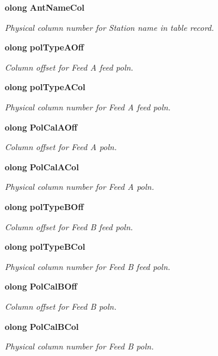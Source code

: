\begin{CompactItemize}
{\bf olong} {\bf Ant\-Name\-Col}
\begin{CompactList}\small\item\em Physical column number for Station name in table record. \item\end{CompactList}\item 
{\bf olong} {\bf pol\-Type\-AOff}
\begin{CompactList}\small\item\em Column offset for Feed A feed poln. \item\end{CompactList}\item 
{\bf olong} {\bf pol\-Type\-ACol}
\begin{CompactList}\small\item\em Physical column number for Feed A feed poln. \item\end{CompactList}\item 
{\bf olong} {\bf Pol\-Cal\-AOff}
\begin{CompactList}\small\item\em Column offset for Feed A poln. \item\end{CompactList}\item 
{\bf olong} {\bf Pol\-Cal\-ACol}
\begin{CompactList}\small\item\em Physical column number for Feed A poln. \item\end{CompactList}\item 
{\bf olong} {\bf pol\-Type\-BOff}
\begin{CompactList}\small\item\em Column offset for Feed B feed poln. \item\end{CompactList}\item 
{\bf olong} {\bf pol\-Type\-BCol}
\begin{CompactList}\small\item\em Physical column number for Feed B feed poln. \item\end{CompactList}\item 
{\bf olong} {\bf Pol\-Cal\-BOff}
\begin{CompactList}\small\item\em Column offset for Feed B poln. \item\end{CompactList}\item 
{\bf olong} {\bf Pol\-Cal\-BCol}
\begin{CompactList}\small\item\em Physical column number for Feed B poln. \item\end{CompactList}\end{CompactItemize}


